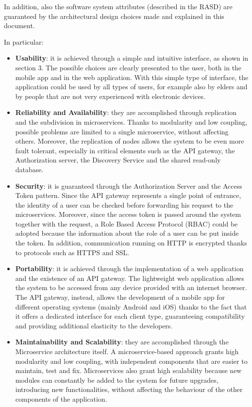 In addition, also the software system attributes (described in the RASD) are guaranteed by the architectural design choices made and explained in this document.

In particular:
\begin{itemize}
    \item \textbf{Usability}: it is achieved through a simple and intuitive interface, as shown in section 3. The possible choices are clearly presented to the user, both in the mobile app and in the web application. With this simple type of interface, the application could be used by all types of users, for example also by elders and by people that are not very experienced with electronic devices.
    
    \item \textbf{Reliability and Availability}: they are accomplished through replication and the subdivision in microservices. Thanks to modularity and low coupling, possible problems are limited to a single microservice, without affecting others. Moreover, the replication of nodes allows the system to be even more fault tolerant, especially in critical elements such as the API gateway, the Authorization server, the Discovery Service and the shared read-only database. 

    \item \textbf{Security}: it is guaranteed through the Authorization Server and the Access Token pattern. Since the API gateway represents a single point of entrance, the identity of a user can be checked before forwarding his request to the microservices. Moreover, since the access token is passed around the system together with the request, a Role Based Access Protocol (RBAC) could be adopted because the information about the role of a user can be put inside the token. In addition, communication running on HTTP is encrypted thanks to protocols such as HTTPS and SSL.

    \item \textbf{Portability}: it is achieved through the implementation of a web application and the existence of an API gateway. The lightweight web application allows the system to be accessed from any device provided with an internet browser. The API gateway, instead, allows the development of a mobile app for different operating systems (mainly Android and iOS) thanks to the fact that it offers a dedicated interface for each client type, guaranteeing compatibility and providing additional elasticity to the developers.

    \item \textbf{Maintainability and Scalability}: they are accomplished through the Microservice architecture itself. A microservice-based approach grants high modularity and low coupling, with independent components that are easier to maintain, test and fix. Microservices also grant high scalability because new modules can constantly be added to the system for future upgrades, introducing new functionalities, without affecting the behaviour of the other components of the application.
\end{itemize}
